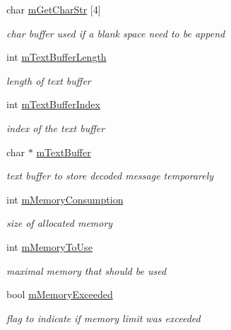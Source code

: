 \begin{DoxyCompactItemize}
char \hyperlink{classMorseDecode_a9349e48b2482afb76cd4e205f34577d1}{m\+Get\+Char\+Str} \mbox{[}4\mbox{]}
\begin{DoxyCompactList}\small\item\em char buffer used if a blank space need to be append \end{DoxyCompactList}\item 
\mbox{\label{classMorseDecode_af5ba80e2fec26ca7984e0a9ee2cfd76b}} 
int \hyperlink{classMorseDecode_af5ba80e2fec26ca7984e0a9ee2cfd76b}{m\+Text\+Buffer\+Length}
\begin{DoxyCompactList}\small\item\em length of text buffer \end{DoxyCompactList}\item 
\mbox{\label{classMorseDecode_afc65e46d9774fb6398c4e6a38f82fab1}} 
int \hyperlink{classMorseDecode_afc65e46d9774fb6398c4e6a38f82fab1}{m\+Text\+Buffer\+Index}
\begin{DoxyCompactList}\small\item\em index of the text buffer \end{DoxyCompactList}\item 
\mbox{\label{classMorseDecode_ab2bbf17c637557f292b9aff9a950304c}} 
char $\ast$ \hyperlink{classMorseDecode_ab2bbf17c637557f292b9aff9a950304c}{m\+Text\+Buffer}
\begin{DoxyCompactList}\small\item\em text buffer to store decoded message temporarely \end{DoxyCompactList}\item 
\mbox{\label{classMorseDecode_ada123cf1f90e9a92e8783d58d9cf57e1}} 
int \hyperlink{classMorseDecode_ada123cf1f90e9a92e8783d58d9cf57e1}{m\+Memory\+Consumption}
\begin{DoxyCompactList}\small\item\em size of allocated memory \end{DoxyCompactList}\item 
\mbox{\label{classMorseDecode_a581eeabfcffe789d60469cbb29884bb1}} 
int \hyperlink{classMorseDecode_a581eeabfcffe789d60469cbb29884bb1}{m\+Memory\+To\+Use}
\begin{DoxyCompactList}\small\item\em maximal memory that should be used \end{DoxyCompactList}\item 
\mbox{\label{classMorseDecode_ab1b6bbbbeb2b5b506d83c875500c7020}} 
bool \hyperlink{classMorseDecode_ab1b6bbbbeb2b5b506d83c875500c7020}{m\+Memory\+Exceeded}
\begin{DoxyCompactList}\small\item\em flag to indicate if memory limit was exceeded \end{DoxyCompactList}\end{DoxyCompactItemize}
